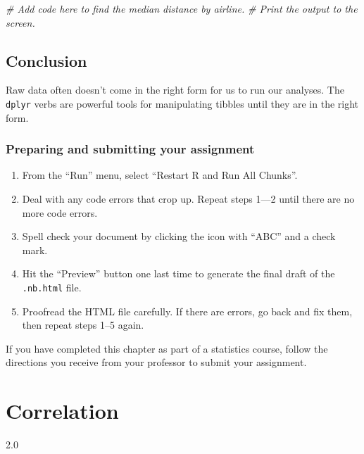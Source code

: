 \documentclass[
]{book}
\newenvironment{Shaded}{\begin{snugshade}}{\end{snugshade}}
\newcommand{\CommentTok}[1]{\textcolor[rgb]{0.56,0.35,0.01}{\textit{#1}}}
\providecommand{\tightlist}{%
  \setlength{\itemsep}{0pt}\setlength{\parskip}{0pt}}
\begin{document}
\begin{Shaded}
\begin{Highlighting}[]
\CommentTok{\# Add code here to find the median distance by airline.}
\CommentTok{\# Print the output to the screen.}
\end{Highlighting}
\end{Shaded}

\hypertarget{manipulating-conclusion}{%
\section{Conclusion}\label{manipulating-conclusion}}

Raw data often doesn't come in the right form for us to run our analyses. The \texttt{dplyr} verbs are powerful tools for manipulating tibbles until they are in the right form.

\hypertarget{manipulating-prep}{%
\subsection{Preparing and submitting your assignment}\label{manipulating-prep}}

\begin{enumerate}
\def\labelenumi{\arabic{enumi}.}
\tightlist
\item
  From the ``Run'' menu, select ``Restart R and Run All Chunks''.
\item
  Deal with any code errors that crop up. Repeat steps 1---2 until there are no more code errors.
\item
  Spell check your document by clicking the icon with ``ABC'' and a check mark.
\item
  Hit the ``Preview'' button one last time to generate the final draft of the \texttt{.nb.html} file.
\item
  Proofread the HTML file carefully. If there are errors, go back and fix them, then repeat steps 1--5 again.
\end{enumerate}

If you have completed this chapter as part of a statistics course, follow the directions you receive from your professor to submit your assignment.

\hypertarget{correlation}{%
\chapter{Correlation}\label{correlation}}

2.0
\end{document}
